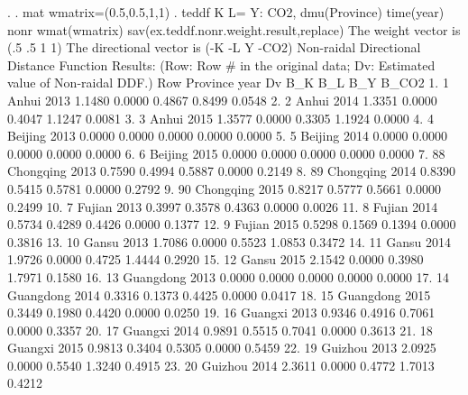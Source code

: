 . 
. mat wmatrix=(0.5,0.5,1,1)
{\smallskip}
. teddf K L= Y: CO2, dmu(Province) time(year) nonr wmat(wmatrix) sav(ex.teddf.nonr.weight.result,replace)
{\smallskip}
 The weight vector is (.5 .5 1 1)
{\smallskip}
 The directional vector is (-K -L Y -CO2)
{\smallskip}
{\smallskip}
 Non-raidal Directional Distance Function Results:
    (Row: Row \# in the original data; Dv: Estimated value of Non-raidal DDF.)
{\smallskip}
     {\TLC}
     {\VBAR} Row       Province   year       Dv      B_K      B_L      B_Y    B_CO2 {\VBAR}
     {\LFTT}
  1. {\VBAR}   1          Anhui   2013   1.1480   0.0000   0.4867   0.8499   0.0548 {\VBAR}
  2. {\VBAR}   2          Anhui   2014   1.3351   0.0000   0.4047   1.1247   0.0081 {\VBAR}
  3. {\VBAR}   3          Anhui   2015   1.3577   0.0000   0.3305   1.1924   0.0000 {\VBAR}
  4. {\VBAR}   4        Beijing   2013   0.0000   0.0000   0.0000   0.0000   0.0000 {\VBAR}
  5. {\VBAR}   5        Beijing   2014   0.0000   0.0000   0.0000   0.0000   0.0000 {\VBAR}
  6. {\VBAR}   6        Beijing   2015   0.0000   0.0000   0.0000   0.0000   0.0000 {\VBAR}
  7. {\VBAR}  88      Chongqing   2013   0.7590   0.4994   0.5887   0.0000   0.2149 {\VBAR}
  8. {\VBAR}  89      Chongqing   2014   0.8390   0.5415   0.5781   0.0000   0.2792 {\VBAR}
  9. {\VBAR}  90      Chongqing   2015   0.8217   0.5777   0.5661   0.0000   0.2499 {\VBAR}
 10. {\VBAR}   7         Fujian   2013   0.3997   0.3578   0.4363   0.0000   0.0026 {\VBAR}
 11. {\VBAR}   8         Fujian   2014   0.5734   0.4289   0.4426   0.0000   0.1377 {\VBAR}
 12. {\VBAR}   9         Fujian   2015   0.5298   0.1569   0.1394   0.0000   0.3816 {\VBAR}
 13. {\VBAR}  10          Gansu   2013   1.7086   0.0000   0.5523   1.0853   0.3472 {\VBAR}
 14. {\VBAR}  11          Gansu   2014   1.9726   0.0000   0.4725   1.4444   0.2920 {\VBAR}
 15. {\VBAR}  12          Gansu   2015   2.1542   0.0000   0.3980   1.7971   0.1580 {\VBAR}
 16. {\VBAR}  13      Guangdong   2013   0.0000   0.0000   0.0000   0.0000   0.0000 {\VBAR}
 17. {\VBAR}  14      Guangdong   2014   0.3316   0.1373   0.4425   0.0000   0.0417 {\VBAR}
 18. {\VBAR}  15      Guangdong   2015   0.3449   0.1980   0.4420   0.0000   0.0250 {\VBAR}
 19. {\VBAR}  16        Guangxi   2013   0.9346   0.4916   0.7061   0.0000   0.3357 {\VBAR}
 20. {\VBAR}  17        Guangxi   2014   0.9891   0.5515   0.7041   0.0000   0.3613 {\VBAR}
 21. {\VBAR}  18        Guangxi   2015   0.9813   0.3404   0.5305   0.0000   0.5459 {\VBAR}
 22. {\VBAR}  19        Guizhou   2013   2.0925   0.0000   0.5540   1.3240   0.4915 {\VBAR}
 23. {\VBAR}  20        Guizhou   2014   2.3611   0.0000   0.4772   1.7013   0.4212 {\VBAR}
